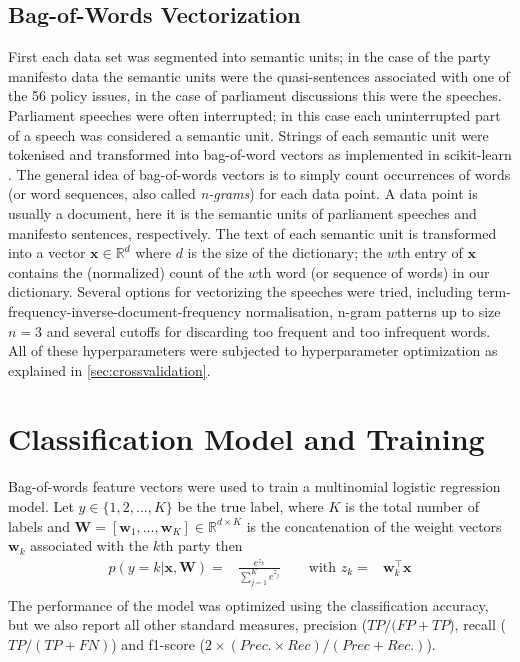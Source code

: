 \documentclass{article}
\renewcommand{\vec}[1]{\mathbf{#1}}
\newcommand{\R}{\mathds{R}}
\begin{document}
\subsection{Bag-of-Words Vectorization}\label{sec:bow-vectorization}
First each data set was segmented into semantic units; in the case of the party manifesto data the semantic units were the quasi-sentences associated with one of the 56 policy issues, in the case of parliament discussions this were the speeches. Parliament speeches were often interrupted; in this case each uninterrupted part of a speech was considered a semantic unit. Strings of each semantic unit were tokenised and transformed into bag-of-word vectors as implemented in scikit-learn \cite{scikit-learn}. The general idea of bag-of-words vectors is to simply count occurrences of words (or word sequences, also called {\em n-grams}) for each data point. A data point is usually a document, here it is the semantic units of parliament speeches and manifesto sentences, respectively. The text of each semantic unit is transformed into a vector $\vec{x}\in\mathds{R}^d$ where $d$ is the size of the dictionary; the $w$th entry of $\vec{x}$ contains the (normalized) count of the $w$th word (or sequence of words) in our dictionary. Several options for vectorizing the speeches were tried, including term-frequency-inverse-document-frequency normalisation, n-gram patterns up to size $n=3$ and several cutoffs for discarding too frequent and too infrequent words. All of these hyperparameters were subjected to hyperparameter optimization as explained in \autoref{sec:crossvalidation}.


\section{Classification Model and Training}\label{sec:model}
Bag-of-words feature vectors were used to train a multinomial logistic regression model. Let $y\in\{1,2,\dots,K\}$ be the true  label, where $K$ is the total number of labels and $\vec{W}=[\vec{w}_1,\dots,\vec{w}_K]\in\R^{d\times K}$ is the concatenation of the weight vectors $\vec{w}_k$ associated with the $k$th party then
\begin{eqnarray}\label{eq:logreg_multiclass}
p(y=k|\vec{x},\vec{W}) = &\frac{e^{z_k}}{\sum_{j=1}^K e^{z_j}} \qquad \textrm{with }  z_k=&\vec{w}_k^{\top}\vec{x} \\\nonumber
\end{eqnarray}
The performance of the model was optimized using the classification accuracy, but we also report all other standard measures, precision ($TP / (FP + TP$), recall ($TP / (TP + FN)$) and f1-score ($2\times (Prec. \times Rec) / (Prec + Rec.)$). \\
\end{document}
